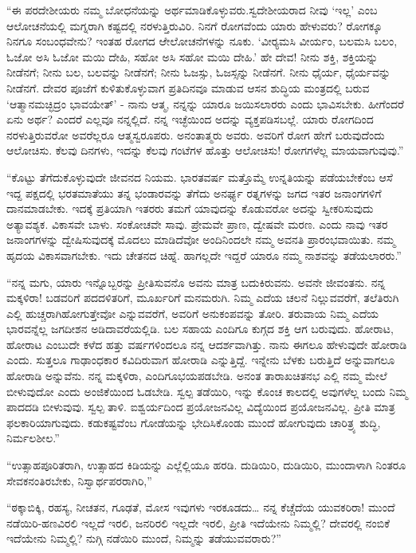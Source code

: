 \newpage

 “ಈ ಪರದೇಶೀಯರು ನಮ್ಮ ಬೋಧನೆಯನ್ನು ಅರ್ಥಮಾಡಿಕೊಳ್ಳುವರು.\break ಸ್ವದೇಶೀಯರಾದ ನೀವು ‘ಇಲ್ಲ’ ಎಂಬ ಆಲೋಚನೆಯಲ್ಲಿ ಮಗ್ನರಾಗಿ ಕಷ್ಟದಲ್ಲಿ ನರಳುತ್ತಿರುವಿರಿ. ನಿನಗೆ ರೋಗವೆಂದು ಯಾರು ಹೇಳುವರು? ರೋಗಕ್ಕೂ ನಿನಗೂ ಸಂಬಂಧವೇನು? ಇಂತಹ ರೋಗದ ಆೇಲೋಚನೆಗಳನ್ನು ನೂಕು. ‘ವೀರ‍್ಯಮಸಿ ವೀರ್ಯಂ, ಬಲಮಸಿ ಬಲಂ, ಓಜೋ ಅಸಿ ಓಜೋ ಮಯಿ ದೇಹಿ, ಸಹೋ ಅಸಿ ಸಹೋ ಮಯಿ ದೇಹಿ.’ ಹೇ ದೇವ! ನೀನು ಶಕ್ತಿ, ಶಕ್ತಿಯನ್ನು ನೀಡೆನಗೆ; ನೀನು ಬಲ, ಬಲವನ್ನು ನೀಡೆನಗೆ; ನೀನು ಓಜಸ್ಸು, ಓಜಸ್ಸನ್ನು ನೀಡೆನಗೆ. ನೀನು ಧೈರ್ಯ, ಧೈರ್ಯವನ್ನು ನೀಡೆನಗೆ. ದೇವರ ಪೂಜೆಗೆ ಕುಳಿತುಕೊಳ್ಳುವಾಗ ಪ್ರತಿದಿನವೂ ಮಾಡುವ ಆಸನ ಶುದ್ಧಿಯ ಮಂತ್ರದಲ್ಲಿ ಬರುವ ‘ಆತ್ಮಾನಮಚ್ಛಿದ್ರಂ ಭಾವಯೇತ್’ - ನಾನು ಆತ್ಮ, ನನ್ನನ್ನು ಯಾರೂ ಜಯಿಸಲಾರರು ಎಂದು ಭಾವಿಸಬೇಕು. ಹೀಗೆಂದರೆ ಏನು ಅರ್ಥ? ಎಂದರೆ ಎಲ್ಲವೂ ನನ್ನಲ್ಲಿದೆ. ನನ್ನ ಇಚ್ಛೆಯಿಂದ ಅದನ್ನು ವ್ಯಕ್ತಪಡಿಸಬಲ್ಲೆ. ಯಾರು ರೋಗದಿಂದ ನರಳುತ್ತಿರುವರೋ ಅವರೆಲ್ಲರೂ ಆತ್ಮಸ್ವರೂಪರು. ಅನಂತಾತ್ಮರು ಅವರು. ಅವರಿಗೆ ರೋಗ ಹೇಗೆ ಬರುವುದೆಂದು ಆಲೋಚಿಸು. ಕೆಲವು ದಿನಗಳು, ಇದನ್ನು ಕೆಲವು ಗಂಟೆಗಳ ಹೊತ್ತು ಆಲೋಚಿಸು! ರೋಗಗಳೆಲ್ಲ ಮಾಯವಾಗುವುವು.” 

 “ಕೊಟ್ಟು ತೆಗೆದುಕೊಳ್ಳುವುದೇ ಜೀವನದ ನಿಯಮ. ಭಾರತವರ್ಷ ಮತ್ತೊಮ್ಮೆ ಉನ್ನತಿಯನ್ನು ಪಡೆಯಬೇಕೆಂಬ ಆಸೆ ಇದ್ದ ಪಕ್ಷದಲ್ಲಿ ಭರತಮಾತೆಯು ತನ್ನ ಭಂಡಾರವನ್ನು ತೆಗೆದು ಅನರ್ಘ್ಯ ರತ್ನಗಳನ್ನು ಜಗದ ಇತರ ಜನಾಂಗಗಳಿಗೆ ದಾನಮಾಡಬೇಕು. ಇದಕ್ಕೆ ಪ್ರತಿಯಾಗಿ ಇತರರು ತಮಗೆ ಯಾವುದನ್ನು ಕೊಡುವರೋ ಅದನ್ನು ಸ್ವೀಕರಿಸುವುದು ಅತ್ಯಾವಶ್ಯಕ. ವಿಕಾಸವೇ ಬಾಳು. ಸಂಕೋಚವೇ ಸಾವು. ಪ್ರೇಮವೇ ಪ್ರಾಣ, ದ್ವೇಷವೇ ಮರಣ. ಎಂದು ನಾವು ಇತರ ಜನಾಂಗಗಳನ್ನು ದ್ವೇಷಿಸುವುದಕ್ಕೆ ಮೊದಲು ಮಾಡಿದೆವೋ ಅಂದಿನಿಂದಲೇ ನಮ್ಮ ಅವನತಿ ಪ್ರಾರಂಭವಾಯಿತು. ನಮ್ಮ ಹೃದಯ ವಿಕಾಸವಾಗಬೇಕು. ಇದು ಚೇತನದ ಚಿಹ್ನೆ. ಹಾಗಲ್ಲದೇ ಇದ್ದರೆ ಯಾರೂ ನಮ್ಮ ನಾಶವನ್ನು ತಡೆಯಲಾರರು.” 

 “ನನ್ನ ಮಗು, ಯಾರು ಇನ್ನೊಬ್ಬರನ್ನು ಪ್ರೀತಿಸುವನೊ ಅವನು ಮಾತ್ರ ಬದುಕಿರುವನು. ಅವನೇ ಜೀವಂತನು. ನನ್ನ ಮಕ್ಕಳಿರಾ!‌ ಬಡವರಿಗೆ ಪದದಳಿತರಿಗೆ, ಮೂರ್ಖರಿಗೆ ಮನಮರುಗಿ. ನಿಮ್ಮ ಎದೆಯ ಚಲನೆ ನಿಲ್ಲುವವರೆಗೆ, ತಲೆತಿರುಗಿ ಎಲ್ಲಿ ಹುಚ್ಚರಾಗಿಹೋಗುತ್ತೇವೋ ಎನ್ನುವವರೆಗೆ, ಅವರಿಗೆ ಅನುಕಂಪವನ್ನು ತೋರಿ. ತರುವಾಯ ನಿಮ್ಮ ಎದೆಯ ಭಾರವನ್ನೆಲ್ಲ ಜಗದೀಶನ ಅಡಿದಾವರೆಯಲ್ಲಿಡಿ. ಬಲ ಸಹಾಯ ಎಂದಿಗೂ ಕುಗ್ಗದ ಶಕ್ತಿ ಆಗ ಬರುವುದು. ಹೋರಾಟ, ಹೋರಾಟ ಎಂಬುದೇ ಕಳೆದ ಹತ್ತು ವರ್ಷಗಳಿಂದಲೂ ನನ್ನ ಆದರ್ಶವಾಗಿತ್ತು. ನಾನು ಈಗಲೂ ಹೇಳುವುದೇ ಹೋರಾಡಿ ಎಂದು. ಸುತ್ತಲೂ ಗಾಢಾಂಧಕಾರ ಕವಿದಿರುವಾಗ ಹೋರಾಡಿ ಎನ್ನುತ್ತಿದ್ದೆ. ಇನ್ನೇನು ಬೆಳಕು ಬರುತ್ತಿದೆ ಅನ್ನುವಾಗಲೂ ಹೋರಾಡಿ ಅನ್ನುವೆನು. ನನ್ನ ಮಕ್ಕಳಿರಾ, ಎಂದಿಗೂ\break ಭಯಪಡಬೇಡಿ. ಅನಂತ ತಾರಾಖಚಿತನಭ ಎಲ್ಲಿ ನಮ್ಮ ಮೇಲೆ ಬೀಳುವುದೋ ಎಂದು ಅಂಜಿಕೆಯಿಂದ ಓಡಬೇಡಿ. ಸ್ವಲ್ಪ ತಡೆಯಿರಿ, ಇನ್ನು ಕೊಂಚ ಕಾಲದಲ್ಲಿ ಅವುಗಳೆಲ್ಲ ಬಂದು ನಿಮ್ಮ ಪಾದದಡಿ ಬೀಳುವುವು. ಸ್ವಲ್ಪ ತಾಳಿ. ಐಶ್ವರ್ಯದಿಂದ ಪ್ರಯೋಜನವಿಲ್ಲ ವಿದ್ಯೆಯಿಂದ ಪ್ರಯೋಜನವಿಲ್ಲ. ಪ್ರೀತಿ ಮಾತ್ರ ಫಲಕಾರಿಯಾಗುವುದು. ಕಡುಕಷ್ಟವೆಂಬ ಗೋಡೆಯನ್ನು ಭೇದಿಸಿಕೊಂಡು ಮುಂದೆ ಹೋಗುವುದು ಚಾರಿತ್ರ್ಯ ಶುದ್ಧಿ, ನಿರ್ಮಲಶೀಲ.” 

 “ಉತ್ಸಾಹಪೂರಿತರಾಗಿ, ಉತ್ಸಾಹದ ಕಿಡಿಯನ್ನು ಎಲ್ಲೆಲ್ಲಿಯೂ ಹರಡಿ. ದುಡಿಯಿರಿ, ದುಡಿಯಿರಿ, ಮುಂದಾಳಾಗಿ ನಿಂತರೂ ಸೇವಕನಂತಿರಬೇಕು, ನಿಸ್ವಾರ್ಥಪರರಾಗಿರಿ,” 

 “ಠಕ್ಕಾಬಿಕ್ಕಿ, ರಹಸ್ಯ, ನೀಚತನ, ಗೂಢತೆ, ಮೋಸ ಇವುಗಳು ಇರಕೂಡದು… ನನ್ನ ಕೆಚ್ಚೆದೆಯ ಯುವಕರಿರಾ! ಮುಂದೆ ನಡೆಯಿರಿ-ಹಣವಿರಲಿ ಇಲ್ಲದೆ ಇರಲಿ, ಜನರಿರಲಿ ಇಲ್ಲದೇ ಇರಲಿ, ಪ್ರೀತಿ ಇದೆಯೇನು ನಿಮ್ಮಲ್ಲಿ? ದೇವರಲ್ಲಿ ನಂಬಿಕೆ ಇದೆಯೇನು ನಿಮ್ಮಲ್ಲಿ? ನುಗ್ಗಿ ನಡೆಯಿರಿ ಮುಂದೆ, ನಿಮ್ಮನ್ನು ತಡೆಯುವವರಾರು?” 

